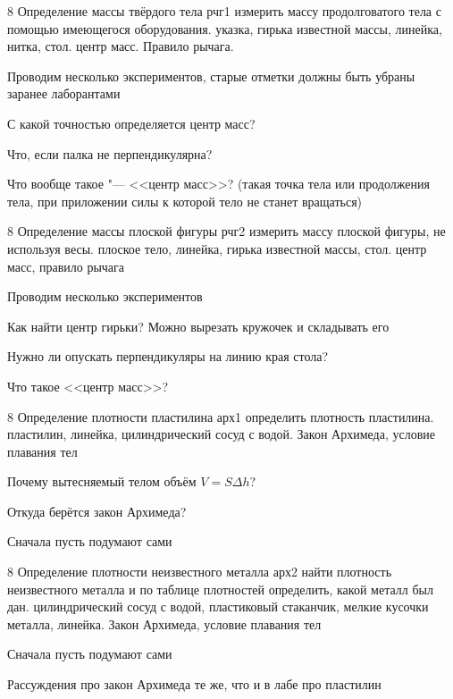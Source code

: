 
\maketitle
\begin{enumerate}
	\item \labtitle
		{8}
		{Определение массы твёрдого тела}
		{рчг1}
		{измерить массу продолговатого тела с помощью имеющегося оборудования.}
		{указка, гирька известной массы, линейка, нитка, стол.}
		{центр масс. Правило рычага.}
		{\item Проводим несколько экспериментов, старые отметки должны быть убраны заранее лаборантами
			\item С какой точностью определяется центр масс?
			\item Что, если палка не перпендикулярна?
		\item Что вообще такое "--- <<центр масс>>? (такая точка тела или продолжения тела, при приложении силы к которой тело не станет вращаться)}
	\item \labtitle
		{8}
		{Определение массы плоской фигуры}
		{рчг2}
		{измерить массу плоской фигуры, не используя весы.}
		{плоское тело, линейка, гирька известной массы, стол.}
		{центр масс, правило рычага}
		{\item Проводим несколько экспериментов
		\item Как найти центр гирьки? Можно вырезать кружочек и складывать его
		\item Нужно ли опускать перпендикуляры на линию края стола?
		\item Что такое <<центр масс>>?}
	\item \labtitle
		{8}
		{Определение плотности пластилина}
		{арх1}
		{определить плотность пластилина.}
		{пластилин, линейка, цилиндрический сосуд с водой.}
		{Закон Архимеда, условие плавания тел}
		{\item Почему вытесняемый телом объём $V=S\Delta h$?
		\item Откуда берётся закон Архимеда?
		\item Сначала пусть подумают сами}
	\item \labtitle
		{8}
		{Определение плотности неизвестного металла}
		{арх2}
		{найти плотность неизвестного металла и по таблице плотностей определить, какой металл был дан.}
		{цилиндрический сосуд с водой, пластиковый стаканчик, мелкие кусочки металла, линейка.}
		{Закон Архимеда, условие плавания тел}
		{\item Сначала пусть подумают сами
		\item Рассуждения про закон Архимеда те же, что и в лабе про пластилин}

\end{enumerate}
